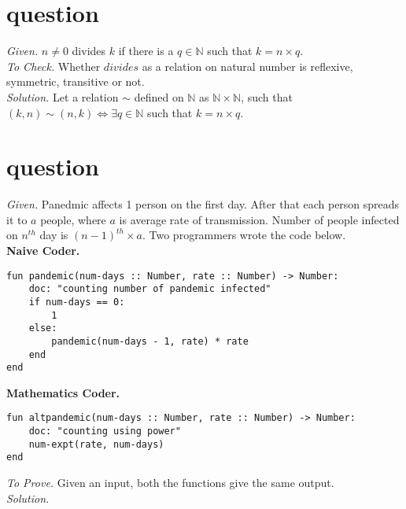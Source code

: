 \documentclass[11pt]{article}
\begin{document}
\section{question}
\emph{Given. } $n \neq 0$ divides $k$ if there is a $q \in \mathbb{N}$ such that $k = n \times q$. \medskip \\
\emph{To Check. } Whether $divides$ as a relation on natural number is reflexive, symmetric, transitive or not. \medskip \\
\emph{Solution. } Let a relation $\sim$ defined on $\mathbb{N}$ as $\mathbb{N} \times \mathbb{N}$, such that $(k, n) \sim (n, k) \iff \exists q \in \mathbb{N}$ such that $k = n \times q$. \medskip \\



\section{question}
\emph{Given. } Panedmic affects 1 person on the first day. After that each person spreads it to $a$ people, where $a$  is average rate of transmission. Number of people infected on $n^{th}$ day is $(n-1)^{th} \times a$. Two programmers wrote the code below.
\medskip \\
\textbf{Naive Coder. }
\begin{lstlisting}[style=python]
fun pandemic(num-days :: Number, rate :: Number) -> Number:
    doc: "counting number of pandemic infected"
    if num-days == 0:
        1
    else:
        pandemic(num-days - 1, rate) * rate
    end
end
\end{lstlisting}

\noindent \textbf{Mathematics Coder. }
\begin{lstlisting}[style=python]
fun altpandemic(num-days :: Number, rate :: Number) -> Number:
    doc: "counting using power"
    num-expt(rate, num-days)
end
\end{lstlisting}
\vspace{10pt}
\emph{To Prove. } Given an input, both the functions give the same output. \medskip \\
\emph{Solution. }
\end{document}
